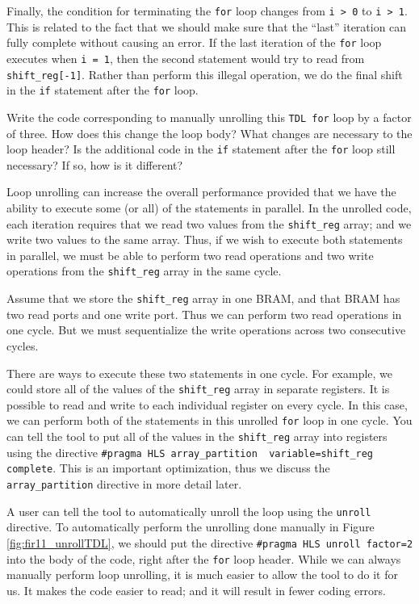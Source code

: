 Finally, the condition for terminating the \lstinline{for} loop changes from \lstinline{i > 0} to \lstinline{i > 1}. This is related to the fact that we should make sure that the ``last'' iteration can fully complete without causing an error. If the last iteration of the \lstinline{for} loop executes when \lstinline{i = 1}, then the second statement would try to read from \lstinline{shift_reg[-1]}. Rather than perform this illegal operation, we do the final shift in the \lstinline{if} statement after the \lstinline{for} loop. 

\begin{exercise}
Write the code corresponding to manually unrolling this \lstinline{TDL for} loop by a factor of three. How does this change the loop body? What changes are necessary to the loop header? Is the additional code in the \lstinline{if} statement after the \lstinline{for} loop still necessary? If so, how is it different?
\end{exercise}

Loop unrolling can increase the overall performance provided that we have the ability to execute some (or all) of the statements in parallel. In the unrolled code, each iteration requires that we read two values from the \lstinline{shift_reg} array; and we write two values to the same array. Thus, if we wish to execute both statements in parallel, we must be able to perform two read operations and two write operations from the \lstinline{shift_reg} array in the same cycle. 

Assume that we store the \lstinline{shift_reg} array in one BRAM, and that BRAM has two read ports and one write port. Thus we can perform two read operations in one cycle. But we must sequentialize the write operations across two consecutive cycles. 

There are ways to execute these two statements in one cycle. For example, we could store all of the values of the \lstinline{shift_reg} array in separate registers. It is possible to read and write to each individual register on every cycle. In this case, we can perform both of the statements in this unrolled \lstinline{for} loop in one cycle. You can tell the \VHLS tool to put all of the values in the \lstinline{shift_reg} array into registers using the directive \lstinline{#pragma HLS array_partition  variable=shift_reg complete}. This is an important optimization, thus we discuss the \lstinline{array_partition} directive in more detail later. 

A user can tell the \VHLS tool to automatically unroll the loop using the \lstinline{unroll} directive. To automatically perform the unrolling done manually in Figure \ref{fig:fir11_unrollTDL}, we should put the directive \lstinline{#pragma HLS unroll factor=2} into the body of the code, right after the \lstinline{for} loop header. While we can always manually perform loop unrolling, it is much easier to allow the tool to do it for us. It makes the code easier to read; and it will result in fewer coding errors. 

